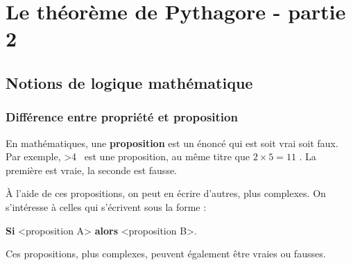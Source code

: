\documentclass[a4paper]{book}
\begin{document}
\setcounter{chapter}{5}
\renewcommand{\monTitre}{Le théorème de Pythagore - partie 2}
\chapter{\monTitre}
\thispagestyle{fancy} 


\section{Notions de logique mathématique}
\subsection{Différence entre propriété et proposition}

    En mathématiques, une \textbf{proposition} est un énoncé qui est soit vrai soit faux. Par exemple, >4 \fg \, est une proposition, au même titre que \og $2\times5=11$ \fg. La première est vraie, la seconde est fausse.

    À l'aide de ces propositions, on peut en écrire d'autres, plus complexes. On s'intéresse à celles qui s'écrivent sous la forme :
    
    \begin{center}
        \og \textbf{Si} <proposition A> \textbf{alors} <proposition B>. \fg
    \end{center}

    Ces propositions, plus complexes, peuvent également être vraies ou fausses.
\end{document}
